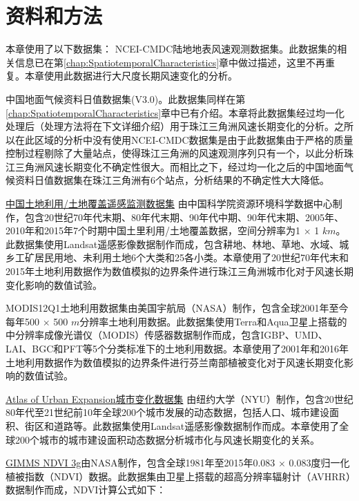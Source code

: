\section{资料和方法}

本章使用了以下数据集：
NCEI-CMDC陆地地表风速观测数据集。此数据集的相关信息已在第\ref{chap:SpatiotemporalCharacteristics}章中做过描述，这里不再重复。本章使用此数据进行大尺度长期风速变化的分析。

中国地面气候资料日值数据集(V3.0)。此数据集同样在第\ref{chap:SpatiotemporalCharacteristics}章中已有介绍。本章将此数据集经过均一化处理后（处理方法将在下文详细介绍）用于珠江三角洲风速长期变化的分析。之所以在此区域的分析中没有使用NCEI-CMDC数据集是由于此数据集由于严格的质量控制过程剔除了大量站点，使得珠江三角洲的风速观测序列只有一个，以此分析珠江三角洲风速长期变化不确定性很大。而相比之下，经过均一化之后的中国地面气候资料日值数据集在珠江三角洲有6个站点，分析结果的不确定性大大降低。

\href{http://www.resdc.cn}{中国土地利用/土地覆盖遥感监测数据集} 由中国科学院资源环境科学数据中心制作，包含20世纪70年代末期、80年代末期、90年代中期、90年代末期、2005年、2010年和2015年7个时期中国土里利用/土地覆盖数据，空间分辨率为1 $\times$ 1 $km$。此数据集使用Landsat遥感影像数据制作而成，包含耕地、林地、草地、水域、城乡工矿居民用地、未利用土地6个大类和25各小类。本章使用了20世纪70年代末和2015年土地利用数据作为数值模拟的边界条件进行珠江三角洲城市化对于风速长期变化影响的数值试验。

MODIS12Q1土地利用数据集\citep{sullamenashe2019hierarchical}由美国宇航局（NASA）制作，包含全球2001年至今每年500 $\times$ 500 $m$分辨率土地利用数据。此数据集使用Terra和Aqua卫星上搭载的中分辨率成像光谱仪（MODIS）传感器数据制作而成，包含IGBP、UMD、LAI、BGC和PFT等5个分类标准下的土地利用数据。本章使用了2001年和2016年土地利用数据作为数值模拟的边界条件进行芬兰南部植被变化对于风速长期变化影响的数值试验。

\href{http://www.atlasofurbanexpansion.org/data}{Atlas of Urban Expansion城市变化数据集} 由纽约大学（NYU）制作，包含20世纪80年代至21世纪前10年全球200个城市发展的动态数据，包括人口、城市建设面积、街区和道路等。此数据集使用Landsat遥感影像数据制作而成。本章使用了全球200个城市的城市建设面积动态数据分析城市化与风速长期变化的关系。

\href{https://climatedataguide.ucar.edu/climate-data/ndvi-normalized-difference-vegetation-index-3rd-generation-nasagfsc-gimms}{GIMMS NDVI 3g}由NASA制作，包含全球1981年至2015年0.083 $\times$ 0.083度归一化植被指数（NDVI）数据。此数据集由卫星上搭载的超高分辨率辐射计（AVHRR）数据制作而成，NDVI计算公式如下：

